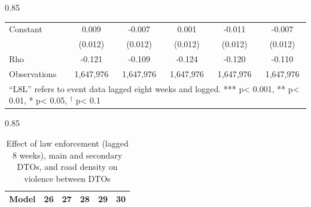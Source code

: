 \documentclass[12pt,letterpaper]{article}
\begin{document}
\begin{landscape}
\begin{center}
\begin{spacing}{0.85}
\begin{longtable}{lccccc}
Constant & 0.009  & -0.007  & 0.001  & -0.011  & -0.007  \\
 & (0.012)  & (0.012)  & (0.012)  & (0.012)  & (0.012)  \\ \hline
                
Rho & -0.121  & -0.109  & -0.124  & -0.120  & -0.110  \\
                
Observations  & 1,647,976  & 1,647,976  & 1,647,976  & 1,647,976  & 1,647,976  \\

\hline  
\multicolumn{6}{l}{``L8L'' refers to event data lagged eight weeks and logged.  *** p< 0.001, ** p< 0.01, * p< 0.05, $^{\dag}$ p< 0.1} \\
 
\end{longtable}
\end{spacing}
\end{center}










\begin{center}
\small
\begin{spacing}{0.85}
\begin{longtable}{lccccc}

\caption{Effect of law enforcement (lagged 8 weeks), main and secondary DTOs, and road density on violence between DTOs} \label{tab:enforcement_MainMinorDTOs_Road_L8L} \\

\hline 
\multicolumn{1}{l}{\textbf{Model }} &\multicolumn{1}{c}{\textbf{26}} & \multicolumn{1}{c}{\textbf{27}} & \multicolumn{1}{c}{\textbf{28}} & \multicolumn{1}{c}{\textbf{29}} & \multicolumn{1}{c}{\textbf{30}} \\ \hline 
\endfirsthead



\end{longtable}
\end{spacing}
\end{center}
\end{landscape}
\end{document}
